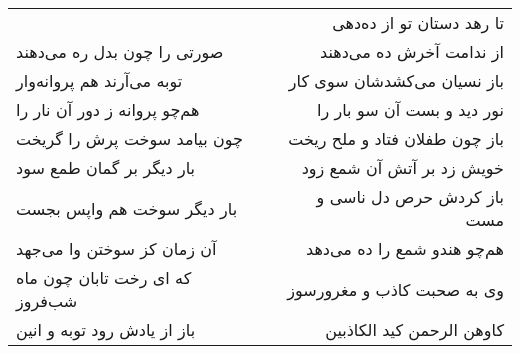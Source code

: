 \begin{center}
\begin{longtable}{l p{0.5cm} r}
&&
تا رهد دستان تو از ده‌دهی
\\
صورتی را چون بدل ره می‌دهند
&&
از ندامت آخرش ده می‌دهند
\\
توبه می‌آرند هم پروانه‌وار
&&
باز نسیان می‌کشدشان سوی کار
\\
هم‌چو پروانه ز دور آن نار را
&&
نور دید و بست آن سو بار را
\\
چون بیامد سوخت پرش را گریخت
&&
باز چون طفلان فتاد و ملح ریخت
\\
بار دیگر بر گمان طمع سود
&&
خویش زد بر آتش آن شمع زود
\\
بار دیگر سوخت هم واپس بجست
&&
باز کردش حرص دل ناسی و مست
\\
آن زمان کز سوختن وا می‌جهد
&&
هم‌چو هندو شمع را ده می‌دهد
\\
که ای رخت تابان چون ماه شب‌فروز
&&
وی به صحبت کاذب و مغرورسوز
\\
باز از یادش رود توبه و انین
&&
کاوهن الرحمن کید الکاذبین
\\
\end{longtable}
\end{center}
